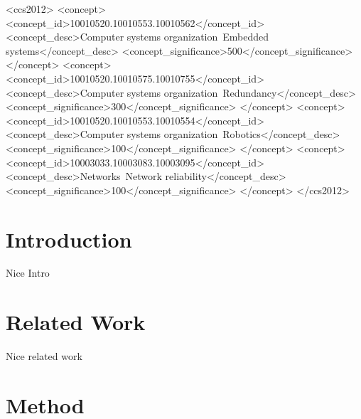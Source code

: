 \documentclass[sigconf]{acmart}
\begin{document}
%
%
\begin{CCSXML}
<ccs2012>
 <concept>
  <concept_id>10010520.10010553.10010562</concept_id>
  <concept_desc>Computer systems organization~Embedded systems</concept_desc>
  <concept_significance>500</concept_significance>
 </concept>
 <concept>
  <concept_id>10010520.10010575.10010755</concept_id>
  <concept_desc>Computer systems organization~Redundancy</concept_desc>
  <concept_significance>300</concept_significance>
 </concept>
 <concept>
  <concept_id>10010520.10010553.10010554</concept_id>
  <concept_desc>Computer systems organization~Robotics</concept_desc>
  <concept_significance>100</concept_significance>
 </concept>
 <concept>
  <concept_id>10003033.10003083.10003095</concept_id>
  <concept_desc>Networks~Network reliability</concept_desc>
  <concept_significance>100</concept_significance>
 </concept>
</ccs2012>
\end{CCSXML}


%

%
\maketitle

\section{Introduction}
Nice Intro

\section{Related Work}
\label{sec:RelatedWork}
Nice related work

\section{Method}
\label{sec:Method}
\end{document}

